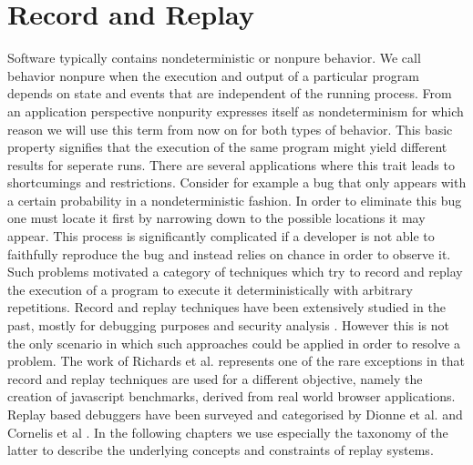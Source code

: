 \documentclass[11pt,a4paper]{book}
\begin{document}
\section{Record and Replay}
Software typically contains nondeterministic or nonpure behavior. We call
behavior nonpure when the execution and output of a particular program
depends on state and events that are independent of the running process.
From an application perspective nonpurity expresses itself as nondeterminism
for which reason we will use this term from now on for both types of behavior.
This basic property signifies that the execution of the same program might
yield different results for seperate runs. There are several applications where
this trait leads to shortcumings and restrictions. Consider for example
a bug that only appears with a certain probability in a nondeterministic
fashion. In order to eliminate this bug one must locate it first by narrowing
down to the possible locations it may appear. This process is significantly
complicated if a developer is not able to faithfully reproduce the bug and
instead relies on chance in order to observe it. Such problems motivated
a category of techniques which try to record and replay the execution of
a program to execute it deterministically with arbitrary repetitions.  
Record and replay techniques have been extensively studied in the past,
mostly for debugging purposes \cite{203227, Burg2013_InteractiveReplayWeb} and security analysis \cite{10.1145/844128.844148}. However this is not the only scenario in
which such approaches could be applied in order to resolve a problem.
The work of Richards et al. \cite{Richards2011-JavascripBenchmarks}
represents one of the rare exceptions in that record and replay techniques
are used for a different objective, namely
the creation of javascript benchmarks, derived from real world browser
applications. Replay based debuggers have been surveyed and categorised
by Dionne et al. \cite{Dionne1996-TaxonomyDebuggers} and Cornelis et al
\cite{Cornelis2003-TaxonomyReplay}. In the following chapters we use especially
the taxonomy of the latter to describe the underlying concepts and constraints
of replay systems.
\end{document}

